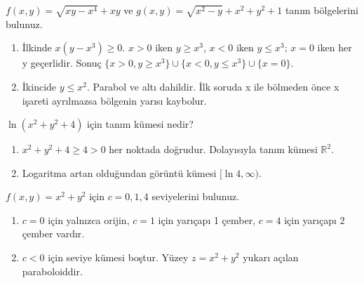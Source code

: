 \begin{tcolorbox}[title={Örnek 4.3 | İşaret ayırımı gerektiren kök},colframe=accent]\(f(x,y)=\sqrt{xy-x^4}+xy\) ve \(g(x,y)=\sqrt{x^2-y}+x^2+y^2+1\) tanım bölgelerini bulunuz.
\par{}\end{tcolorbox}
\begin{tcolorbox}[title={Adım adım çözüm},colback=green!3!white,colframe=green]\begin{enumerate}
\item İlkinde \(x(y-x^3)\ge0\). \(x>0\) iken \(y\ge x^3\), \(x<0\) iken \(y\le x^3\); \(x=0\) iken her y geçerlidir. Sonuç \(\{x>0,y\ge x^3\}\cup\{x<0,y\le x^3\}\cup\{x=0\}\).
\item İkincide \(y\le x^2\). Parabol ve altı dahildir. İlk soruda x ile bölmeden önce x işareti ayrılmazsa bölgenin yarısı kaybolur.
\end{enumerate}\end{tcolorbox}
\begin{tcolorbox}[title={Örnek 4.4 | Her yerde tanımlı logaritma},colframe=accent]\(\ln(x^2+y^2+4)\) için tanım kümesi nedir?
\par{}\end{tcolorbox}
\begin{tcolorbox}[title={Adım adım çözüm},colback=green!3!white,colframe=green]\begin{enumerate}
\item \(x^2+y^2+4\ge4>0\) her noktada doğrudur. Dolayısıyla tanım kümesi \(\mathbb R^2\).
\item Logaritma artan olduğundan görüntü kümesi \([\ln4,\infty)\).
\end{enumerate}\end{tcolorbox}
\begin{tcolorbox}[title={Örnek 4.5 | Paraboloidin seviye eğrileri},colframe=accent]\(f(x,y)=x^2+y^2\) için \(c=0,1,4\) seviyelerini bulunuz.
\par{}\end{tcolorbox}
\begin{tcolorbox}[title={Adım adım çözüm},colback=green!3!white,colframe=green]\begin{enumerate}
\item \(c=0\) için yalnızca orijin, \(c=1\) için yarıçapı 1 çember, \(c=4\) için yarıçapı 2 çember vardır.
\item \(c<0\) için seviye kümesi boştur. Yüzey \(z=x^2+y^2\) yukarı açılan paraboloiddir.
\end{enumerate}\end{tcolorbox}
